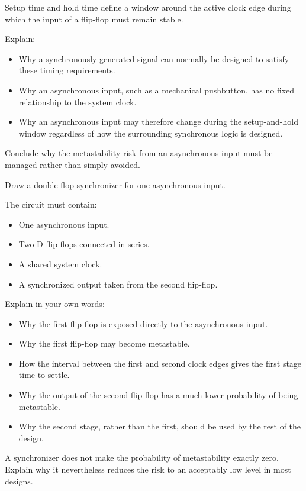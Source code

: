 \label{c4:ex:2}
Setup time and hold time define a window around the active clock edge during which the input of a
flip-flop must remain stable.

\noindent Explain:
\begin{itemize}
  \item Why a synchronously generated signal can normally be designed to satisfy these timing
    requirements.
  \item Why an asynchronous input, such as a mechanical pushbutton, has no fixed relationship to the
    system clock.
  \item Why an asynchronous input may therefore change during the setup-and-hold window regardless
    of how the surrounding synchronous logic is designed.
\end{itemize}
Conclude why the metastability risk from an asynchronous input must be managed rather than simply
avoided.

\label{c4:set:2}

\label{c4:ex:3}
Draw a double-flop synchronizer for one asynchronous input.

\noindent The circuit must contain:
\begin{itemize}
  \item One asynchronous input.
  \item Two D flip-flops connected in series.
  \item A shared system clock.
  \item A synchronized output taken from the second flip-flop.
\end{itemize}
Explain in your own words:
\begin{itemize}
  \item Why the first flip-flop is exposed directly to the asynchronous input.
  \item Why the first flip-flop may become metastable.
  \item How the interval between the first and second clock edges gives the first stage time to
    settle.
  \item Why the output of the second flip-flop has a much lower probability of being metastable.
  \item Why the second stage, rather than the first, should be used by the rest of the design.
\end{itemize}
A synchronizer does not make the probability of metastability exactly zero. Explain why it
nevertheless reduces the risk to an acceptably low level in most designs.

